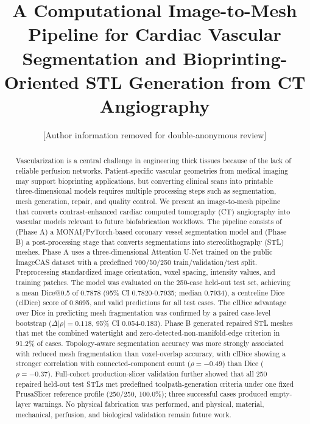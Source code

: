 \documentclass[anonymous]{iopjournal}
\begin{document}

\title{A Computational Image-to-Mesh Pipeline for Cardiac Vascular Segmentation and Bioprinting-Oriented STL Generation from CT Angiography}

\author{[Author information removed for double-anonymous review]}


\begin{abstract}
Vascularization is a central challenge in engineering thick tissues because of the lack of reliable perfusion networks. Patient-specific vascular geometries from medical imaging may support bioprinting applications, but converting clinical scans into printable three-dimensional models requires multiple processing steps such as segmentation, mesh generation, repair, and quality control. We present an image-to-mesh pipeline that converts contrast-enhanced cardiac computed tomography (CT) angiography into vascular models relevant to future biofabrication workflows. The pipeline consists of (Phase A) a MONAI/PyTorch-based coronary vessel segmentation model and (Phase B) a post-processing stage that converts segmentations into stereolithography (STL) meshes. Phase A uses a three-dimensional Attention U-Net trained on the public ImageCAS dataset with a predefined 700/50/250 train/validation/test split. Preprocessing standardized image orientation, voxel spacing, intensity values, and training patches. The model was evaluated on the 250-case held-out test set, achieving a mean Dice@0.5 of 0.7878 (95\% CI 0.7820-0.7935; median 0.7934), a centreline Dice (clDice) score of 0.8695, and valid predictions for all test cases. The clDice advantage over Dice in predicting mesh fragmentation was confirmed by a paired case-level bootstrap ($\Delta|\rho| = 0.118$, 95\% CI 0.054-0.183). Phase B generated repaired STL meshes that met the combined watertight and zero-detected-non-manifold-edge criterion in 91.2\% of cases. Topology-aware segmentation accuracy was more strongly associated with reduced mesh fragmentation than voxel-overlap accuracy, with clDice showing a stronger correlation with connected-component count ($\rho=-0.49$) than Dice ($\rho=-0.37$). Full-cohort production-slicer validation further showed that all 250 repaired held-out test STLs met predefined toolpath-generation criteria under one fixed PrusaSlicer reference profile (250/250, 100.0\%); three successful cases produced empty-layer warnings. No physical fabrication was performed, and physical, material, mechanical, perfusion, and biological validation remain future work.

\end{abstract}
\end{document}
